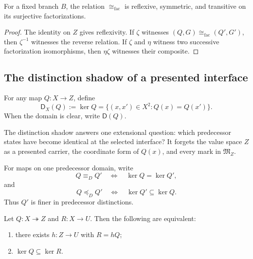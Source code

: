 \begin{proposition}\label{prop:factorization-isomorphism-equivalence-v14}
For a fixed branch $B$, the relation $\cong_{\mathrm{fac}}$ is reflexive, symmetric, and transitive on its surjective factorizations.
\end{proposition}

\begin{proof}
The identity on $Z$ gives reflexivity. If $\zeta$ witnesses $(Q,G)\cong_{\mathrm{fac}}(Q',G')$, then $\zeta^{-1}$ witnesses the reverse relation. If $\zeta$ and $\eta$ witness two successive factorization isomorphisms, then $\eta\zeta$ witnesses their composite.
\end{proof}

\subsection{The distinction shadow of a presented interface}

\begin{definition}\label{def:distinction-shadow-v13}
For any map $Q:X\to Z$, define
\[
\boxed{
\mathsf D_X(Q):=\ker Q
=\{(x,x')\in X^2:Q(x)=Q(x')\}.
}
\]
When the domain is clear, write $\mathsf D(Q)$.
\end{definition}

The distinction shadow answers one extensional question: which predecessor states have become identical at the selected interface? It forgets the value space $Z$ as a presented carrier, the coordinate form of $Q(x)$, and every mark in $\mathfrak M_Z$.

\begin{definition}\label{def:distinction-order-v13}
For maps on one predecessor domain, write
\[
Q\equiv_DQ'
\quad\Longleftrightarrow\quad
\ker Q=\ker Q',
\]
and
\[
\boxed{Q\preceq_DQ'\quad\Longleftrightarrow\quad\ker Q'\subseteq\ker Q.}
\]
Thus $Q'$ is finer in predecessor distinctions.
\end{definition}

\begin{lemma}\label{lem:fiber-factorization-v13}
Let $Q:X\twoheadrightarrow Z$ and $R:X\to U$. Then the following are equivalent:
\begin{enumerate}[label=(\roman*)]
\item there exists $h:Z\to U$ with $R=hQ$;
\item $\ker Q\subseteq\ker R$.
\end{enumerate}
\end{lemma}


